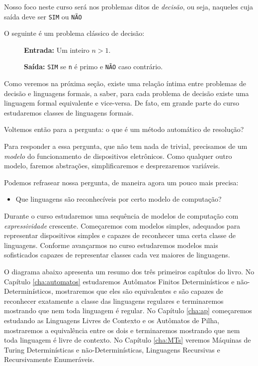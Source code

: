 Nosso foco neste curso será nos problemas ditos de {\em decisão}, ou seja, naqueles cuja saída deve ser {\tt SIM} ou {\tt NÃO}


\begin{example}
  O seguinte é um problema clássico de decisão:
  \begin{description}
  \item[] {\bf Entrada:} Um inteiro $n > 1$.
  \item[] {\bf Saída:} {\tt SIM} se {\tt n} é primo e {\tt NÃO} caso contrário.
  \end{description}
\end{example}

Como veremos na próxima seção, existe uma relação íntima entre problemas de decisão e linguagens formais, a saber, para cada problema de decisão existe uma linguagem formal equivalente e vice-versa.
De fato, em grande parte do curso estudaremos classes de linguagens formais.

Voltemos então para a pergunta: o que é um método automático de resolução?

Para responder a essa pergunta, que não tem nada de trivial, precisamos de um {\em modelo} do funcionamento de dispositivos eletrônicos.
Como qualquer outro modelo, faremos abstrações, simplificaremos e desprezaremos variáveis.

Podemos refrasear nossa pergunta, de maneira agora um pouco mais precisa:
\begin{itemize}
\item Que linguagens são reconhecíveis por certo modelo de computação?
\end{itemize}

Durante o curso estudaremos uma sequência de modelos de computação com {\em expressividade} crescente.
Começaremos com modelos simples, adequados para representar dispositivos simples e capazes de reconhecer uma certa classe de linguagens.
Conforme avançarmos no curso estudaremos modelos mais sofisticados capazes de representar classes cada vez maiores de linguagens.

O diagrama abaixo apresenta um resumo dos três primeiros capítulos do livro.
No Capítulo \ref{cha:automatos} estudaremos Autômatos Finitos Determinísticos e não-Determinísticos, mostraremos que eles são equivalentes e são capazes de reconhecer exatamente a classe das linguagens regulares e terminaremos mostrando que nem toda linguagem é regular.
No Capítulo \ref{cha:ap} começaremos estudando as Linguagens Livres de Contexto e os Autômatos de Pilha, mostraremos a equivalência entre os dois e terminaremos mostrando que nem toda linguagem é livre de contexto.
No Capítulo \ref{cha:MTs} veremos Máquinas de Turing Determinísticas e não-Determinísticas, Linguagens Recursivas e Recursivamente Enumeráveis.

